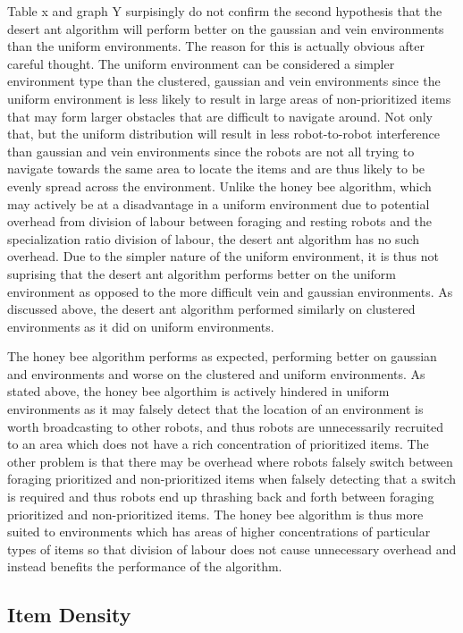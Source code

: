 Table x and graph Y surpisingly do not confirm the second hypothesis that the desert ant algorithm will perform better on the gaussian and vein environments than the uniform environments. The reason for this is actually obvious after careful thought. The uniform environment can be considered a simpler environment type than the  clustered, gaussian and vein environments since the uniform environment is less likely to result in large areas of non-prioritized items that may form larger obstacles that are difficult to navigate around. Not only that, but the uniform distribution will result in less robot-to-robot interference than gaussian and vein environments since the robots are not all trying to navigate towards the same area to locate the items and are thus likely to be evenly spread across the environment. Unlike the honey bee algorithm, which may actively be at a disadvantage in a uniform environment due to potential overhead from division of labour between foraging and resting robots and the specialization ratio division of labour, the desert ant algorithm has no such overhead. Due to the simpler nature of the uniform environment, it is thus not suprising that the desert ant algorithm performs better on the uniform environment as opposed to the more difficult vein and gaussian environments. As discussed above, the desert ant algorithm performed similarly on clustered environments as it did on uniform environments. 

The honey bee algorithm performs as expected, performing better on gaussian and environments and worse on the clustered and uniform environments. As stated above, the honey bee algorthim is actively hindered in uniform environments as it may falsely detect that the location of an environment is worth broadcasting to other robots, and thus robots are unnecessarily recruited to an area which does not have a rich concentration of prioritized items. The other problem is that there may be overhead where robots falsely switch between foraging prioritized and non-prioritized items when falsely detecting that a switch is required and thus robots end up thrashing back and forth between foraging prioritized and non-prioritized items. The honey bee algorithm is thus more suited to environments which has areas of higher concentrations of particular types of items so that division of labour does not cause unnecessary overhead and instead benefits the performance of the algorithm. 

\subsection{Item Density}
\label{results:itemdensity}

